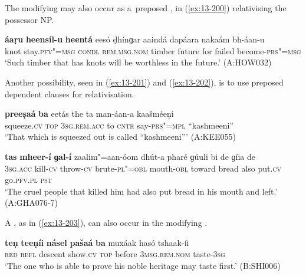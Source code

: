 The modifying  may also occur as a~preposed  , in (\ref{ex:13-200}) relativising the possessor NP.

\begin{exe}
\ex
\label{ex:13-200}
\gll \textbf{áaṛu} \textbf{heensíl-u} \textbf{heentá} eesó ḍhínɡar aaindá  dapáara nakaám bh-áan-u  \\
knot stay.\textsc{pfv"=msg} \textsc{condl} \textsc{rem.msg.nom} timber future  for failed become-\textsc{prs"=msg} \\
\glt `Such timber that has knots will be worthless in the future.' (A:HOW032) 
\end{exe}

Another possibility, seen in (\ref{ex:13-201}) and (\ref{ex:13-202}), is to use preposed dependent  clauses for relativisation.

\begin{exe}
\ex
\label{ex:13-201}
\gll \textbf{preeṣaá} \textbf{ba} eetás the ta man-áan-a kaašméeṇi \\
squeeze.\textsc{cv} \textsc{top} \textsc{3sg.rem.acc} to \textsc{cntr} say-\textsc{prs"=mpl} ``kashmeeni'' \\
\glt `That which is squeezed out is called ``kashmeeni''' (A:KEE055)

\ex
\label{ex:13-202}
\gll \textbf{tas} \textbf{mheer-í} \textbf{ɡal-í} zaalim"=aan-óom dhút-a  pharé ɡúuli bi de ɡíia de \\
\textsc{3sg.acc} kill-\textsc{cv} throw-\textsc{cv} brute-\textsc{pl"=obl} mouth-\textsc{obl}  toward bread also put.\textsc{cv} go.\textsc{pfv.pl} \textsc{pst} \\
\glt `The cruel people that killed him had also put bread in his mouth and left.' (A:GHA076-7) 
\end{exe}

A , as in (\ref{ex:13-203}), can also occur in the modifying . 

\begin{exe}
\ex
\label{ex:13-203}
\gll \textbf{teṇ} \textbf{teeṇíi} \textbf{násel} \textbf{pašaá} \textbf{ba} muxáak hasó  tshaak-íi \\
\textsc{red} \textsc{refl} descent show.\textsc{cv} \textsc{top} before \textsc{3msg.rem.nom}  taste-\textsc{3sg} \\
\glt `The one who is able to prove his noble heritage may taste first.' (B:SHI006) 
\end{exe}

